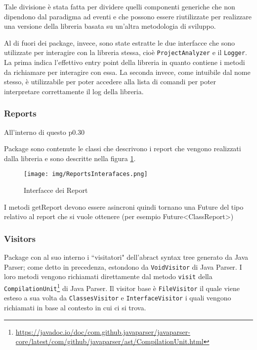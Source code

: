 Tale divisione è stata fatta per dividere quelli componenti generiche che non dipendono dal paradigma ad eventi e che possono essere riutilizzate per realizzare una versione della libreria basata su un'altra metodologia di sviluppo.

Al di fuori dei package, invece, sono state estratte le due interfacce che sono utilizzate per interagire con la libreria stessa, cioè \texttt{ProjectAnalyzer} e il \texttt{Logger}.
%
La prima indica l'effettivo entry point della libreria in quanto contiene i metodi da richiamare per interagire con essa.
%
La seconda invece, come intuibile dal nome stesso, è utilizzabile per poter accedere alla lista di comandi per poter interpretare correttamente il log della libreria.

\subsubsection{Reports}

All'interno di questo p0.30

Package sono contenute le classi che descrivono i report che vengono realizzati dalla libreria e sono descritte nella figura \ref{fig:reports_interfaces}.

\begin{figure}
    \centering
    \texttt{[image: img/ReportsInterafaces.png]}
    \caption{Interfacce dei Report}
    \label{fig:reports_interfaces}
\end{figure}




I metodi getReport devono essere asincroni quindi tornano una Future del tipo relativo al report che si vuole ottenere (per esempio Future\textless ClassReport\textgreater)

\subsubsection{Visitors}
\label{subsubs:visitors}

Package con al suo interno i ``visitatori" dell'abract syntax tree generato da Java Parser; come detto in precedenza, estondono da \texttt{VoidVisitor} di Java Parser. I loro metodi vengono richiamati direttamente dal metodo \texttt{visit} della \texttt{CompilationUnit}\footnote{\url{https://javadoc.io/doc/com.github.javaparser/javaparser-core/latest/com/github/javaparser/ast/CompilationUnit.html}} di Java Parser. Il visitor base è \texttt{FileVisitor} il quale viene esteso a sua volta da \texttt{ClassesVisitor} e \texttt{InterfaceVisitor} i quali vengono richiamati in base al contesto in cui ci si trova. 


